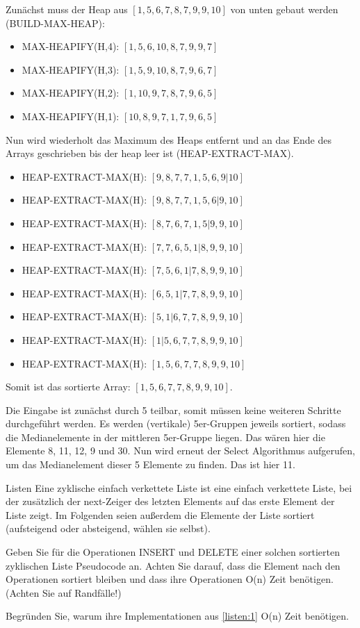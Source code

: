 \documentclass{exercisesheet}
\begin{document}
\begin{solutions}
  \item Zunächst muss der Heap aus $[1, 5,6, 7,8,7,9, 9,10]$ von unten gebaut werden (BUILD-MAX-HEAP):
  \begin{itemize}
    \item MAX-HEAPIFY(H,4): $[1, 5,6, 10,8,7,9, 9,7]$
    \item MAX-HEAPIFY(H,3): $[1, 5,9, 10,8,7,9, 6,7]$
    \item MAX-HEAPIFY(H,2): $[1, 10,9, 7,8,7,9, 6,5]$
    \item MAX-HEAPIFY(H,1): $[10, 8,9, 7,1,7,9, 6,5]$
  \end{itemize}
  Nun wird wiederholt das Maximum des Heaps entfernt und an das Ende des Arrays geschrieben bis der heap leer ist (HEAP-EXTRACT-MAX).
  \begin{itemize}
    \item HEAP-EXTRACT-MAX(H): $[9, 8,7, 7,1,5,6, 9|10]$
    \item HEAP-EXTRACT-MAX(H): $[9, 8,7, 7,1,5,6|9,10]$
    \item HEAP-EXTRACT-MAX(H): $[8, 7,6, 7,1,5|9,9,10]$
    \item HEAP-EXTRACT-MAX(H): $[7, 7,6, 5,1|8,9,9,10]$
    \item HEAP-EXTRACT-MAX(H): $[7, 5,6, 1|7,8,9,9,10]$
    \item HEAP-EXTRACT-MAX(H): $[6, 5,1|7,7,8,9,9,10]$
    \item HEAP-EXTRACT-MAX(H): $[5, 1|6,7,7,8,9,9,10]$
    \item HEAP-EXTRACT-MAX(H): $[1|5,6,7,7,8,9,9,10]$
    \item HEAP-EXTRACT-MAX(H): $[1,5,6,7,7,8,9,9,10]$
  \end{itemize}
  Somit ist das sortierte Array: $[1,5,6,7,7,8,9,9,10]$.
  \item Die Eingabe ist zunächst durch 5 teilbar, somit müssen keine weiteren Schritte durchgeführt werden. Es werden (vertikale) 5er-Gruppen jeweils sortiert, sodass die Medianelemente in der mittleren 5er-Gruppe liegen. Das wären hier die Elemente 8, 11, 12, 9 und 30. Nun wird erneut der Select Algorithmus aufgerufen, um das Medianelement dieser 5 Elemente zu finden. Das ist hier 11.
\end{solutions}

\begin{eexercises}{Listen}{
    Eine zyklische einfach verkettete Liste ist eine einfach verkettete Liste, bei der zusätzlich der next-Zeiger des letzten Elements auf das erste Element der Liste zeigt. Im Folgenden seien außerdem die Elemente der Liste sortiert (aufsteigend oder absteigend, wählen sie selbst).
  }
  \item\label{listen:1} Geben Sie für die Operationen INSERT und DELETE einer solchen sortierten zyklischen Liste Pseudocode an. Achten Sie darauf, dass die Element nach den Operationen sortiert bleiben und dass ihre Operationen O(n) Zeit benötigen. (Achten Sie auf Randfälle!)
  \item Begründen Sie, warum ihre Implementationen aus \ref{listen:1} O(n) Zeit benötigen.
\end{eexercises}
\end{document}
